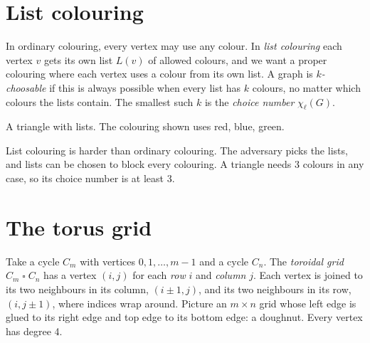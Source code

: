 \documentclass[11pt,oneside,openany]{book}
\newcommand{\T}{\mathbin{\square}}
\begin{document}
\section{List colouring}

In ordinary colouring, every vertex may use any colour. In \emph{list colouring} each vertex $v$
gets its own list $L(v)$ of allowed colours, and we want a proper colouring where each vertex
uses a colour from its own list. A graph is \emph{$k$-choosable} if this is always possible when
every list has $k$ colours, no matter which colours the lists contain. The smallest such $k$ is
the \emph{choice number} $\chi_\ell(G)$.

\begin{center}
\end{center}
\vspace{-0.5em}
{\small\centering A triangle with lists. The colouring shown uses red, blue, green.\par}

List colouring is harder than ordinary colouring. The adversary picks the lists, and lists can be
chosen to block every colouring. A triangle needs 3 colours in any case, so its choice number is
at least 3.

\section{The torus grid}

Take a cycle $C_m$ with vertices $0,1,\dots,m-1$ and a cycle $C_n$. The \emph{toroidal grid}
$C_m \T C_n$ has a vertex $(i,j)$ for each \emph{row} $i$ and \emph{column} $j$. Each vertex is
joined to its two neighbours in its column, $(i \pm 1, j)$, and its two neighbours in its row,
$(i, j \pm 1)$, where indices wrap around. Picture an $m \times n$ grid whose left edge is glued
to its right edge and top edge to its bottom edge: a doughnut. Every vertex has degree 4.
\end{document}
